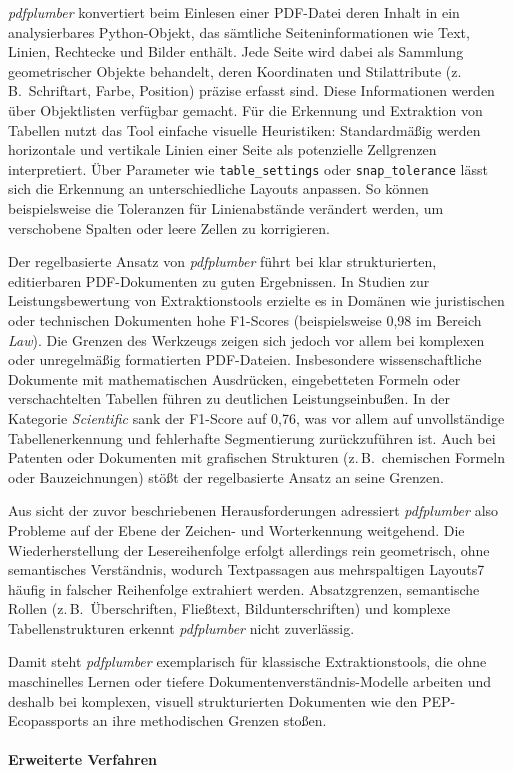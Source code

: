 \emph{pdfplumber} konvertiert beim Einlesen einer PDF-Datei deren Inhalt in ein analysierbares Python-Objekt, das sämtliche Seiteninformationen
wie Text, Linien, Rechtecke und Bilder enthält. Jede Seite wird dabei als Sammlung geometrischer Objekte behandelt, deren Koordinaten und Stilattribute 
(z.\,B.\ Schriftart, Farbe, Position) präzise erfasst sind. \cite{Yang2025} 
Diese Informationen werden über Objektlisten verfügbar gemacht. 
Für die Erkennung und Extraktion von Tabellen nutzt das Tool einfache visuelle Heuristiken: Standardmäßig werden horizontale und vertikale Linien
einer Seite als potenzielle Zellgrenzen interpretiert.  \cite{Yang2025}
Über Parameter wie \texttt{table\_settings} oder \texttt{snap\_tolerance} lässt sich die Erkennung an unterschiedliche Layouts anpassen. 
So können beispielsweise die Toleranzen für Linienabstände verändert werden, um verschobene Spalten oder leere Zellen zu korrigieren. \cite{Yang2025}

Der regelbasierte Ansatz von \emph{pdfplumber} führt bei klar strukturierten, editierbaren PDF-Dokumenten zu guten Ergebnissen. 
In Studien zur Leistungsbewertung von Extraktionstools erzielte es in Domänen wie juristischen oder technischen
Dokumenten hohe F1-Scores (beispielsweise 0{,}98 im Bereich \emph{Law}). \cite{Adhikari2025}
Die Grenzen des Werkzeugs zeigen sich jedoch vor allem bei komplexen oder unregelmäßig formatierten PDF-Dateien. 
Insbesondere wissenschaftliche Dokumente mit mathematischen Ausdrücken, eingebetteten Formeln oder verschachtelten Tabellen führen zu deutlichen Leistungseinbußen. 
In der Kategorie \emph{Scientific} sank der F1-Score auf 0{,}76, was vor allem auf unvollständige Tabellenerkennung und fehlerhafte Segmentierung zurückzuführen ist. 
Auch bei Patenten oder Dokumenten mit grafischen Strukturen (z.\,B.\ chemischen Formeln oder Bauzeichnungen) stößt der regelbasierte Ansatz an seine Grenzen. \cite{Adhikari2025}

Aus sicht der zuvor beschriebenen Herausforderungen adressiert \emph{pdfplumber} also Probleme auf der Ebene der Zeichen- und Worterkennung weitgehend.
Die Wiederherstellung der Lesereihenfolge erfolgt allerdings rein geometrisch, ohne semantisches Verständnis, wodurch Textpassagen aus mehrspaltigen Layouts7
häufig in falscher Reihenfolge extrahiert werden. 
Absatzgrenzen, semantische Rollen (z.\,B.\ Überschriften, Fließtext, Bildunterschriften) und komplexe Tabellenstrukturen erkennt \emph{pdfplumber} nicht zuverlässig.

Damit steht \emph{pdfplumber} exemplarisch für klassische Extraktionstools, die ohne maschinelles Lernen oder tiefere Dokumentenverständnis-Modelle
arbeiten und deshalb bei komplexen, visuell strukturierten Dokumenten wie den PEP-Ecopassports an ihre methodischen Grenzen stoßen.

\paragraph{Erweiterte Verfahren}




